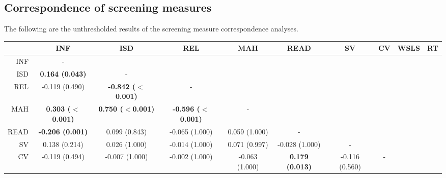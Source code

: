 \documentclass[a4paper,notitlepage,12pt]{article}
\begin{document}
\break
\subsection*{Correspondence of screening measures}

The following are the unthresholded results of the screening measure correspondence analyses.

\begin{table}[H]
    \centering
    \begin{adjustbox}{center}
    \tiny
    \begin{tabular}{rccccccccc}
        \toprule
        {} & INF &      ISD &      REL &     MAH &     READ &       SV &       CV &     WSLS & RT \\
        \midrule
        INF  &                           - &                             &                             &                            &                          &                            &                             &                             &    \\
        ISD  &      \textbf{0.164 (0.043)} &                           - &                             &                            &                          &                            &                             &                             &    \\
        REL  &              -0.119 (0.490) &  \textbf{-0.842 ($<$0.001)} &                           - &                            &                          &                            &                             &                             &    \\
        MAH  &   \textbf{0.303 ($<$0.001)} &   \textbf{0.750 ($<$0.001)} &  \textbf{-0.596 ($<$0.001)} &                          - &                          &                            &                             &                             &    \\
        READ &     \textbf{-0.206 (0.001)} &               0.099 (0.843) &              -0.065 (1.000) &              0.059 (1.000) &                        - &                            &                             &                             &    \\
        SV   &               0.138 (0.214) &               0.026 (1.000) &              -0.014 (1.000) &              0.071 (0.997) &           -0.028 (1.000) &                          - &                             &                             &    \\
        CV   &              -0.119 (0.494) &              -0.007 (1.000) &              -0.002 (1.000) &             -0.063 (1.000) &   \textbf{0.179 (0.013)} &             -0.116 (0.560) &                           - &                             &    \\

\end{tabular}
\end{adjustbox}
\end{table}
\end{document}
